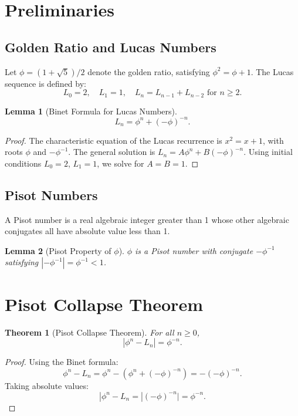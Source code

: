 \documentclass{article}
\newtheorem{theorem}{Theorem}
\newtheorem{lemma}{Lemma}
\theoremstyle{remark}
\begin{document}
\section{Preliminaries}

\subsection{Golden Ratio and Lucas Numbers}

Let $\phi = (1 + \sqrt{5})/2$ denote the golden ratio, satisfying $\phi^2 = \phi + 1$. The Lucas sequence is defined by:
\[
L_0 = 2, \quad L_1 = 1, \quad L_n = L_{n-1} + L_{n-2} \text{ for } n \geq 2.
\]

\begin{lemma}[Binet Formula for Lucas Numbers]
\[
L_n = \phi^n + (-\phi)^{-n}.
\]
\end{lemma}

\begin{proof}
The characteristic equation of the Lucas recurrence is $x^2 = x + 1$, with roots $\phi$ and $-\phi^{-1}$. The general solution is $L_n = A\phi^n + B(-\phi)^{-n}$. Using initial conditions $L_0 = 2$, $L_1 = 1$, we solve for $A = B = 1$.
\end{proof}

\subsection{Pisot Numbers}

A Pisot number is a real algebraic integer greater than 1 whose other algebraic conjugates all have absolute value less than 1.

\begin{lemma}[Pisot Property of $\phi$]
$\phi$ is a Pisot number with conjugate $-\phi^{-1}$ satisfying $|-\phi^{-1}| = \phi^{-1} < 1$.
\end{lemma}

\section{Pisot Collapse Theorem}

\begin{theorem}[Pisot Collapse Theorem]
For all $n \geq 0$,
\[
|\phi^n - L_n| = \phi^{-n}.
\]
\end{theorem}

\begin{proof}
Using the Binet formula:
\[
\phi^n - L_n = \phi^n - (\phi^n + (-\phi)^{-n}) = -(-\phi)^{-n}.
\]
Taking absolute values:
\[
|\phi^n - L_n = |(-\phi)^{-n}| = \phi^{-n}.
\]
\end{proof}
\end{document}
